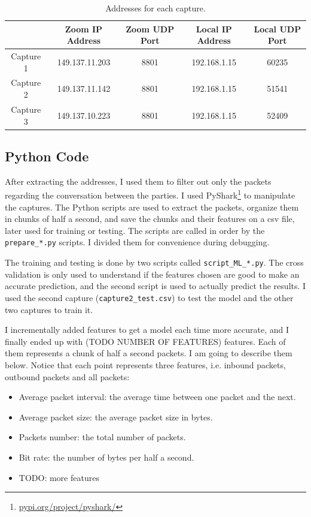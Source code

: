 \documentclass[12pt, conference]{IEEEtran}
\begin{document}
\begin{table}[ht]
    \centering
    \begin{tabular}{| c ||c c c c||}
     \hline
      & Zoom IP Address & Zoom UDP Port & Local IP Address & Local UDP Port \\
     \hline\hline
     Capture 1 & 149.137.11.203 & 8801 & 192.168.1.15 & 60235 \\ 
     \hline
     Capture 2 & 149.137.11.142 & 8801 & 192.168.1.15 & 51541 \\
     \hline
     Capture 3 & 149.137.10.223 & 8801 & 192.168.1.15 & 52409 \\ 
     \hline
    \end{tabular}
    \caption{Addresses for each capture.}
    \label{table:table-addresses}
\end{table}


\subsection{Python Code}
After extracting the addresses, I used them to filter out only the packets regarding the conversation between the parties. I used PyShark\footnote{\href{https://pypi.org/project/pyshark/}{pypi.org/project/pyshark/}} to manipulate the captures. The Python scripts are used to extract the packets, organize them in chunks of half a second, and save the chunks and their features on a csv file, later used for training or testing. The scripts are called in order by the \texttt{prepare\_*.py} scripts. I divided them for convenience during debugging.

The training and testing is done by two scripts called \texttt{script\_ML\_*.py}. The cross validation is only used to understand if the features chosen are good to make an accurate prediction, and the second script is used to actually predict the results. I used the second capture (\texttt{capture2\_test.csv}) to test the model and the other two captures to train it.

I incrementally added features to get a model each time more accurate, and I finally ended up with (TODO NUMBER OF FEATURES) features. Each of them represents a chunk of half a second packets. I am going to describe them below. Notice that each point represents three features, i.e. inbound packets, outbound packets and all packets:
\begin{itemize}
    \item Average packet interval: the average time between one packet and the next.
    \item Average packet size: the average packet size in bytes.
    \item Packets number: the total number of packets.
    \item Bit rate: the number of bytes per half a second.
    \item TODO: more features
\end{itemize}
\end{document}
